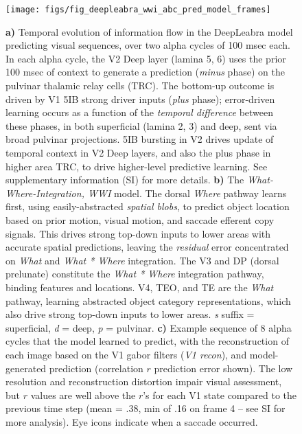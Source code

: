 \documentclass[12pt,twoside]{naturefigs}  %
\newif\myifpdf
\begin{document}
\begin{figure}
  \centering\texttt{[image: figs/fig\_deepleabra\_wwi\_abc\_pred\_model\_frames]}
  \caption{\small \protect{} {\bf a)} Temporal evolution of information flow in the DeepLeabra model predicting visual sequences, over two alpha cycles of 100 msec each.   In each alpha cycle, the V2 Deep layer (lamina 5, 6) uses the prior 100 msec of context to generate a prediction ({\em minus} phase) on the pulvinar thalamic relay cells (TRC). The bottom-up outcome is driven by V1 5IB strong driver inputs ({\em plus} phase); error-driven learning occurs as a function of the {\em temporal difference} between these phases, in both superficial (lamina 2, 3) and deep, sent via broad pulvinar projections. 5IB bursting in V2 drives update of temporal context in V2 Deep layers, and also the plus phase in higher area TRC, to drive higher-level predictive learning.  See supplementary information (SI) for more details. {\bf b)} The {\em What-Where-Integration, WWI} model. The dorsal {\em Where} pathway learns first, using easily-abstracted {\em spatial blobs}, to predict object location based on prior motion, visual motion, and saccade efferent copy signals.  This drives strong top-down inputs to lower areas with accurate spatial predictions, leaving the {\em residual} error concentrated on {\em What} and {\em What * Where} integration.  The V3 and DP (dorsal prelunate) constitute the {\em What * Where} integration pathway, binding features and locations.  V4, TEO, and TE are the {\em What} pathway, learning abstracted object category representations, which also drive strong top-down inputs to lower areas.  {\em s} suffix = superficial, {\em d} = deep, {\em p} = pulvinar. {\bf c)} Example sequence of 8 alpha cycles that the model learned to predict, with the reconstruction of each image based on the V1 gabor filters ({\em V1 recon}), and model-generated prediction (correlation $r$ prediction error shown).  The low resolution and reconstruction distortion impair visual assessment, but $r$ values are well above the $r$'s for each V1 state compared to the previous time step (mean = .38, min of .16 on frame 4 -- see SI for more analysis).  Eye icons indicate when a saccade occurred.}
  \label{fig.model}
\end{figure}

\end{document}
